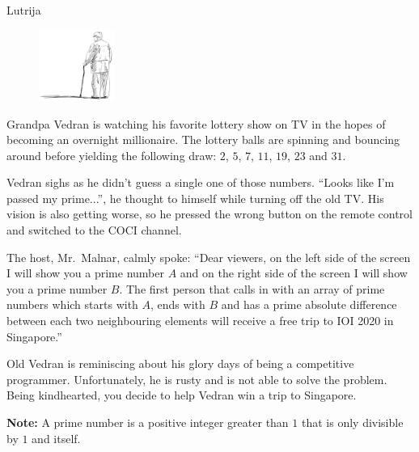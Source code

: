 \begin{statement}[
  problempoints=70,
  timelimit=2 seconds,
  memorylimit=512 MiB,
]{Lutrija}

\setlength\intextsep{-0.1cm}
\begin{figure}
\centering
\includegraphics[width=0.22\textwidth]{img/vedran_kurdija.png}
\end{figure}


Grandpa Vedran is watching his favorite lottery show on TV in the hopes of
becoming an overnight millionaire. The lottery balls are spinning and bouncing
around before yielding the following draw: $2$, $5$, $7$, $11$, $19$, $23$ and
$31$.

Vedran sighs as he didn't guess a single one of those numbers. ``Looks like
I'm passed my prime...'', he thought to himself while turning off the old
TV. His vision is also getting worse, so he pressed the wrong button on the
remote control and switched to the COCI channel.

The host, Mr.\ Malnar, calmly spoke: ``Dear viewers, on the left side of the screen
I will show you a prime number $A$ and on the right side of the screen I will
show you a prime number $B$. The first person that calls in with an array of
prime numbers which starts with $A$, ends with $B$ and has a prime absolute
difference between each two neighbouring elements will receive a free trip
to IOI 2020 in Singapore.''


Old Vedran is reminiscing about his glory days of being a competitive programmer.
Unfortunately, he is rusty and is not able to solve the problem. Being
kindhearted, you decide to help Vedran win a trip to Singapore.

\textbf{Note:} A prime number is a positive integer greater than $1$ that is
only divisible by $1$ and itself.



\end{statement}
